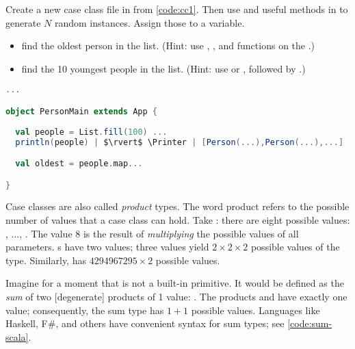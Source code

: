 \documentclass[10 pt]{article}
\begin{document}
\begin{example}
Create a new case class  file in  from \autoref{code:cc1}. Then use  and useful methods in  to generate $N$ random  instances. Assign those to a variable.
\begin{itemize}
  \item find the oldest person in the list. (Hint: use , , and  functions on the .)
  \item find the 10 youngest people in the list. (Hint: use  or , followed by .)
\end{itemize}

\begin{lstlisting}[caption={Pattern matching}, label={code:pmex}, language=Scala, escapechar=|]
...

object PersonMain extends App {
  
  val people = List.fill(100) ...  
  println(people) | $\rvert$ \Printer | [Person(...),Person(...),...]

  val oldest = people.map...

}
\end{lstlisting}
\end{example}

Case classes are also called \emph{product} types. The word product refers to the possible number of values that a case class can hold. Take : there are eight possible values: , ..., . The value $8$ is the result of \emph{multiplying} the possible values of all parameters. s have two values; three  values yield $2 \times 2 \times 2$ possible values of the  type. Similarly,  has $4294967295 \times 2$ possible values. 

Imagine for a moment that  is not a built-in primitive. It would be defined as the \emph{sum} of two [degenerate] products of 1 value: . The products  and  have exactly one value; consequently, the sum type  has $1 + 1$ possible values. Languages like Haskell\cite{haskell}, F\#\cite{fsharp}, and others have convenient syntax for sum types; see \autoref{code:sum-scala}.
\end{document}
